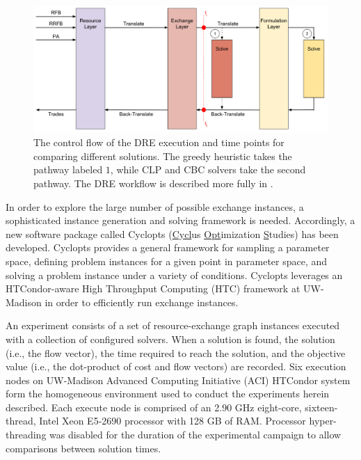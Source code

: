 \documentclass{anstrans}
\begin{document}
\begin{figure}
  \begin{center}
    \includegraphics[width=2\columnwidth]{exchange_xlation_timing.pdf}
    \caption[]{
      \label{fig:dre_time}
      The control flow of the DRE execution and time points for comparing
      different solutions. The greedy heuristic takes the pathway labeled $1$,
      while CLP and CBC solvers take the second pathway. The DRE workflow is
      described more fully in \cite{gidden_agent-based_2013,
        gidden_agent-based_2014}. }
  \end{center}
\end{figure}

In order to explore the large number of possible exchange instances, a
sophisticated instance generation and solving framework is needed. Accordingly,
a new software package called Cyclopts (\underline{Cycl}us
\underline{Opt}imization \underline{S}tudies) has been developed. Cyclopts
provides a general framework for sampling a parameter space, defining problem
instances for a given point in parameter space, and solving a problem instance
under a variety of conditions. Cyclopts leverages an HTCondor-aware High
Throughput Computing (HTC) framework at UW-Madison in order to efficiently run
exchange instances.

An experiment consists of a set of resource-exchange graph instances executed
with a collection of configured solvers. When a solution is found, the solution
(i.e., the flow vector), the time required to reach the solution, and the
objective value (i.e., the dot-product of cost and flow vectors) are
recorded. Six execution nodes on UW-Madison Advanced Computing Initiative (ACI)
HTCondor system form the homogeneous environment used to conduct the experiments
herein described. Each execute node is comprised of an 2.90 GHz eight-core,
sixteen-thread, Intel Xeon E5-2690 processor with 128 GB of RAM. Processor
hyper-threading was disabled for the duration of the experimental campaign to
allow comparisons between solution times.
\end{document}
